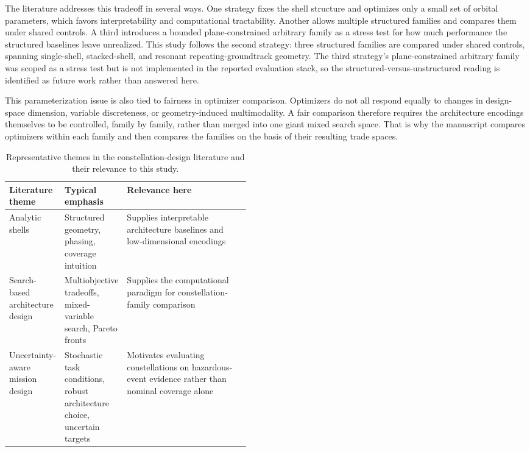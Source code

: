 The literature addresses this tradeoff in several ways. One strategy fixes the shell structure and optimizes only a small set of orbital parameters, which favors interpretability and computational tractability. Another allows multiple structured families and compares them under shared controls. A third introduces a bounded plane-constrained arbitrary family as a stress test for how much performance the structured baselines leave unrealized. This study follows the second strategy: three structured families are compared under shared controls, spanning single-shell, stacked-shell, and resonant repeating-groundtrack geometry. The third strategy's plane-constrained arbitrary family was scoped as a stress test but is not implemented in the reported evaluation stack, so the structured-versus-unstructured reading is identified as future work rather than answered here.

This parameterization issue is also tied to fairness in optimizer comparison. Optimizers do not all respond equally to changes in design-space dimension, variable discreteness, or geometry-induced multimodality. A fair comparison therefore requires the architecture encodings themselves to be controlled, family by family, rather than merged into one giant mixed search space. That is why the manuscript compares optimizers within each family and then compares the families on the basis of their resulting trade spaces.

\begin{table}[htb]
    \centering
    \caption[Constellation-design literature themes]{Representative themes in the constellation-design literature and their relevance to this study.}
    \label{tab:lit_constellation_themes}
    \begin{tabularx}{0.92\linewidth}{@{}L{0.21\linewidth}L{0.25\linewidth}Y@{}}
        \toprule
        Literature theme & Typical emphasis & Relevance here \\
        \midrule
        Analytic shells & Structured geometry, phasing, coverage intuition & Supplies interpretable architecture baselines and low-dimensional encodings \\
        Search-based architecture design & Multiobjective tradeoffs, mixed-variable search, Pareto fronts & Supplies the computational paradigm for constellation-family comparison \\
        Uncertainty-aware mission design & Stochastic task conditions, robust architecture choice, uncertain targets & Motivates evaluating constellations on hazardous-event evidence rather than nominal coverage alone \\
        \bottomrule
    \end{tabularx}
\end{table}

